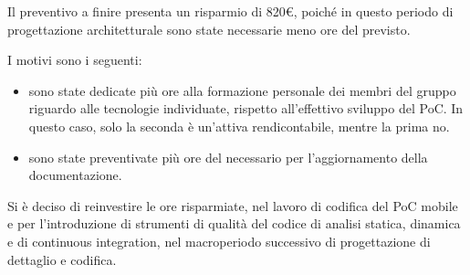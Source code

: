 Il preventivo a finire presenta un risparmio di 820\euro, poiché in questo periodo di progettazione architetturale sono state necessarie meno ore del previsto.

I motivi sono i seguenti:
\begin{itemize}
	\item sono state dedicate più ore alla formazione personale dei membri del gruppo riguardo alle tecnologie individuate,
	rispetto all'effettivo sviluppo del PoC. In questo caso, solo la seconda è un'attiva rendicontabile, mentre la prima no.
	\item sono state preventivate più ore del necessario per l'aggiornamento della documentazione.
\end{itemize}

Si è deciso di reinvestire le ore risparmiate, nel lavoro di codifica del PoC mobile e per l'introduzione di strumenti di qualità del codice di analisi statica, dinamica e di continuous integration, nel macroperiodo successivo di progettazione di dettaglio e codifica.

